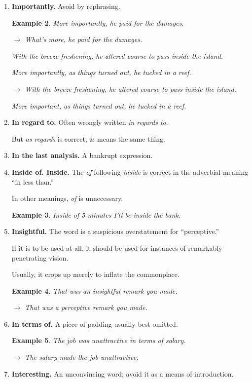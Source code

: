 \documentclass{article}
\newtheorem{example}{Example}
\begin{document}
\begin{enumerate}
\begin{example}
		Since she was a a farmer, we inferred that she got up early.
	\end{example}
	\item {\bf Importantly.} Avoid by rephrasing.
	\begin{example}
		More importantly, he paid for the damages.
		
		$\to$ What's more, he paid for the damages.
		
		With the breeze freshening, he altered course to pass inside the island.
		
		More importantly, as things turned out, he tucked in a reef.
		
		$\to$ With the breeze freshening, he altered course to pass inside the island.
		
		More important, as things turned out, he tucked in a reef.
	\end{example}
	\item {\bf In regard to.} Often wrongly written {\it in regards to}.
	
	But {\it as regards} is correct, \& means the same thing.
	\item {\bf In the last analysis.} A bankrupt expression.
	\item {\bf Inside of. Inside.} The {\it of} following {\it inside} is correct in the adverbial meaning ``in less than.''
	
	In other meanings, {\it of} is unnecessary.
	\begin{example}
		Inside of 5 minutes I'll be inside the bank.
	\end{example}
	\item {\bf Insightful.} The word is a suspicious overstatement for ``perceptive.''
	
	If it is to be used at all, it should be used for instances of remarkably penetrating vision.
	
	Usually, it crops up merely to inflate the commonplace.
	\begin{example}
		That was an insightful remark you made.
		
		$\to$ That was a perceptive remark you made.
	\end{example}
	\item {\bf In terms of.} A piece of padding usually best omitted.
	\begin{example}
		The job was unattractive in terms of salary.
		
		$\to$ The salary made the job unattractive.
	\end{example}
	\item {\bf Interesting.} An unconvincing word; avoid it as a means of introduction.
	

\end{enumerate}
\end{document}
